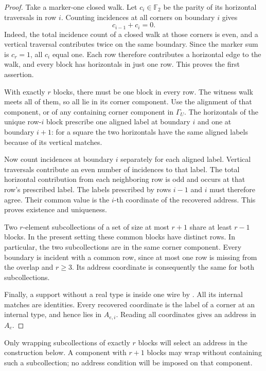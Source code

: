 \documentclass[11pt]{article}
\theoremstyle{definition}
\newcommand{\F}{\mathbb F_2}
\begin{document}
\begin{proof}
Take a marker-one closed walk. Let \(c_i\in\F\) be the parity of its
horizontal traversals in row \(i\). Counting incidences at all corners
on boundary \(i\) gives
\[
 c_{i-1}+c_i=0.
\]
Indeed, the total incidence count of a closed walk at those corners is
even, and a vertical traversal contributes twice on the same boundary.
Since the marker sum is \(c_r=1\), all \(c_i\) equal one. Each row
therefore contributes a horizontal edge to the walk, and every block
has horizontals in just one row. This proves the first assertion.

With exactly \(r\) blocks, there must be one block in every row.
The witness walk meets all of them, so all lie in its corner component.
Use the alignment of that component, or of any containing corner
component in \(\Gamma_U\). The horizontals of the unique row-\(i\)
block prescribe one aligned label at boundary \(i\) and one at boundary
\(i+1\): for a square the two horizontals have the same aligned labels
because of its vertical matches.

Now count incidences at boundary \(i\) separately for each aligned label.
Vertical traversals contribute an even number of incidences to that
label. The total horizontal contribution from each neighboring row is
odd and occurs at that row's prescribed label. The labels prescribed
by rows \(i-1\) and \(i\) must therefore agree. Their common value is the
\(i\)-th coordinate of the recovered address. This proves existence and
uniqueness.

Two \(r\)-element subcollections of a set of size at most \(r+1\) share
at least \(r-1\) blocks. In the present setting these common blocks have
distinct rows. In particular, the two subcollections are in the same
corner component. Every boundary is incident with a common row, since
at most one row is missing from the overlap and \(r\ge3\). Its address
coordinate is consequently the same for both subcollections.

Finally, a support without a real type is inside one wire by
. All its internal matches are identities.
Every recovered coordinate is the label of a corner at an internal
type, and hence lies in \(A_{e,i}\). Reading all coordinates gives an
address in \(A_e\).
\end{proof}

Only wrapping subcollections of exactly \(r\) blocks will select an
address in the construction below. A component with \(r+1\) blocks may
wrap without containing such a subcollection; no address condition will
be imposed on that component.
\end{document}
